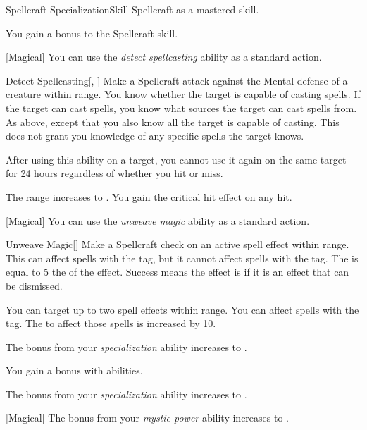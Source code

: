     \begin{feat}{Spellcraft Specialization}{Skill}
        \featpre Spellcraft as a mastered skill.

         You gain a  bonus to the Spellcraft skill.

        [Magical] You can use the \textit{detect spellcasting} ability as a standard action.
        \begin{freeability}{Detect Spellcasting}[, ]
            Make a Spellcraft attack against the Mental defense of a creature within \rngmed range.
            \hit You know whether the target is capable of casting spells.
            If the target can cast spells, you know what sources the target can cast spells from.
            \crit As above, except that you also know all  the target is capable of casting.
            This does not grant you knowledge of any specific spells the target knows.

            After using this ability on a target, you cannot use it again on the same target for 24 hours regardless of whether you hit or miss.

            \rankline
             The range increases to \rnglong.
             You gain the critical hit effect on any hit.
        \end{freeability}

        [Magical] You can use the \textit{unweave magic} ability as a standard action.
        \begin{freeability}{Unweave Magic}[]
            Make a Spellcraft check on an active spell effect within \rngmed range.
            This can affect spells with the  tag, but it cannot affect spells with the  tag.
            The  is equal to 5 \add the  of the effect.
            Success means the effect is  if it is an effect that can be dismissed.

            \rankline
             You can target up to two spell effects within range.
             You can affect spells with the  tag.
            The  to affect those spells is increased by 10.
        \end{freeability}

         The bonus from your \textit{specialization} ability increases to .

         You gain a  bonus  with  abilities.

         The bonus from your \textit{specialization} ability increases to .

        [Magical] The bonus from your \textit{mystic power} ability increases to .
    \end{feat}


